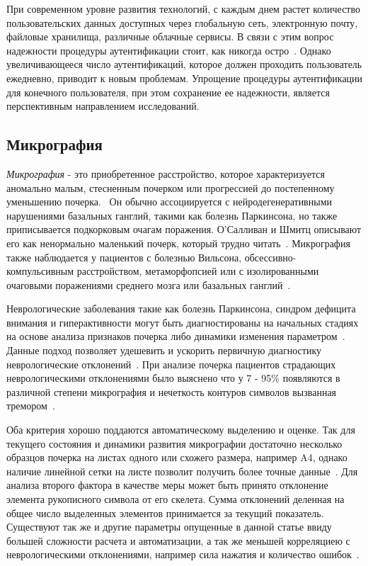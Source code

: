 При современном уровне развития технологий, с каждым днем растет количество пользовательских данных доступных через глобальную сеть, электронную почту, файловые хранилища, различные облачные сервисы. В связи с этим вопрос надежности процедуры аутентификации стоит, как никогда остро~\cite{vorona}. Однако увеличивающееся число аутентификаций, которое должен проходить пользователь ежедневно, приводит к новым проблемам. Упрощение процедуры аутентификации для конечного пользователя, при этом сохранение ее надежности, является перспективным направлением исследований.

\subsection{Микрография}
\emph{Микрография} - это приобретенное расстройство, которое характеризуется аномально малым, стесненным почерком или прогрессией до постепенному уменьшению почерка.~\cite[c.~221]{larner} Он обычно ассоциируется с нейродегенеративными нарушениями базальных ганглий, такими как болезнь Паркинсона, но также приписывается подкорковым очагам поражения. О'Салливан и Шмитц описывают его как ненормально маленький почерк, который трудно читать~\cite[с.~177]{metman_kompoliti}. Микрография также наблюдается у пациентов с болезнью Вильсона, обсессивно-компульсивным расстройством, метаморфопсией или с изолированными очаговыми поражениями среднего мозга или базальных ганглий~\cite{mavrogiorgou_mergl_tigges_husseini_schroter_juckel_zaudig_hegerl}.

Неврологические заболевания такие как болезнь Паркинсона, синдром дефицита внимания и гиперактивности могут быть диагностированы на начальных стадиях на основе анализа признаков почерка либо динамики изменения параметром~\cite{wiki_micrographia}. Данные подход позволяет удешевить и ускорить первичную диагностику неврологические отклонений~\cite{mavrogiorgou_mergl_tigges_husseini_schroter_juckel_zaudig_hegerl}.
При анализе почерка пациентов страдающих неврологическими отклонениями было выяснено что у 7 - 95\% появляются в различной степени микрография и нечеткость контуров символов вызванная тремором~\cite{mckhight}.

Оба критерия хорошо поддаются автоматическому выделению и оценке. Так для текущего состояния и динамики развития микрографии достаточно несколько образцов почерка на листах одного или схожего размера, например A4, однако наличие линейной сетки на листе позволит получить более точные данные~\cite{nervous_system_disorders}.
Для анализа второго фактора в качестве меры может быть принято отклонение элемента рукописного символа от его скелета. Сумма отклонений деленная на общее число выделенных элементов принимается за текущий показатель.
Существуют так же и другие параметры опущенные в данной статье ввиду большей сложности расчета и автоматизации, а так же меньшей корреляциею с неврологическими отклонениями, например сила нажатия и количество ошибок~\cite{ziliotto_cersosimo_micheli}.

